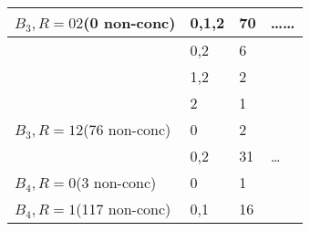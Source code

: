 \documentclass[11pt]{amsart}
\begin{document}
\begin{center}
\begin{longtable}{p{2cm}p{1cm}p{1cm}p{10cm}}
        $B_3, R=02$\newline\small(0 non-conc) & 0,1,2 & 70 &
        \mbox{}
        \mbox{}
        \mbox{}
        \mbox{}
        \mbox{}
        \mbox{}
        \mbox{}
        \dots\dots
        \\\hline
        & 0,2 & 6 &
        \mbox{}
        \mbox{}
        \mbox{}
        \mbox{}
        \mbox{}
        \mbox{}
        \\\hline
        & 1,2 & 2 &
        \mbox{}
        \mbox{}
        \\\hline
        & 2 & 1 &
        \mbox{}
        \\\hline\hline
        $B_3, R=12$\newline\small(76 non-conc) & 0 & 2 &
        \mbox{}
        \mbox{}
        \\\hline
        & 0,2 & 31 &
        \mbox{}
        \mbox{}
        \mbox{}
        \mbox{}
        \dots
        \\\hline\hline
        $B_4, R=0$\newline\small(3 non-conc) & 0 & 1 &
        \mbox{}
        \\\hline\hline
        $B_4, R=1$\newline\small(117 non-conc) & 0,1 & 16 &
        \mbox{}
        \mbox{}
        \mbox{}
        \mbox{}
        \mbox{}
        \mbox{}
        \mbox{}
        \mbox{}
        \mbox{}
        \mbox{}
        \mbox{}
        \mbox{}
        \mbox{}
        \mbox{}
        \mbox{}
        \mbox{}
    \end{longtable}
  \end{center}
\end{document}
